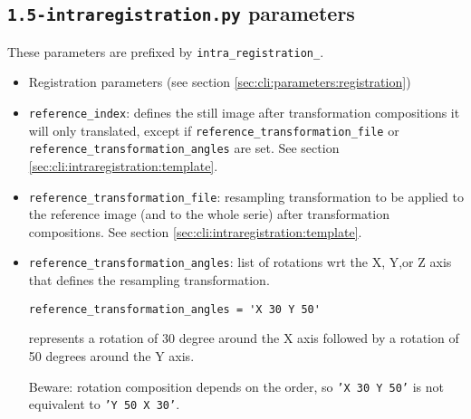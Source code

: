 \subsection{\texttt{1.5-intraregistration.py} parameters}
\label{sec:cli:parameters:intraregistration}

These parameters are prefixed by \texttt{intra\_registration\_}.
\begin{itemize}
\itemsep -0.5ex
\item Registration parameters 
(see section \ref{sec:cli:parameters:registration}) 

\item \texttt{reference\_index}:
  defines the still image after transformation compositions it will 
  only translated, except if \texttt{reference\_transformation\_file} 
  or \texttt{reference\_transformation\_angles} are set.
  See section \ref{sec:cli:intraregistration:template}.
\item \texttt{reference\_transformation\_file}:
  resampling transformation to be applied to the reference image 
  (and to the whole serie) after transformation compositions.
  See section \ref{sec:cli:intraregistration:template}.
\item \texttt{reference\_transformation\_angles}:
  list of rotations wrt the X, Y,or Z axis that defines the resampling
  transformation.
\begin{verbatim}
reference_transformation_angles = 'X 30 Y 50'
\end{verbatim}
  represents a rotation of 30 degree around the X axis followed by a 
  rotation of 50 degrees around the Y axis.
  
  Beware: rotation composition depends on the order, so 
  \texttt{'X 30 Y 50'} is not equivalent to \texttt{'Y 50 X 30'}.


\end{itemize}
